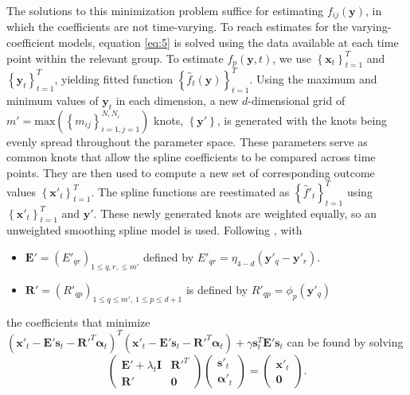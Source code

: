 \documentclass[11pt,reqno]{article}
\theoremstyle{definition}
\begin{document}
The solutions to this minimization problem suffice for estimating $f_{ij}(\mathbf{y})$, in which the coefficients are not time-varying. To reach estimates for the varying-coefficient models, equation \ref{eq:5} is solved using the data available at each time point within the relevant group. To estimate $f_p(\mathbf{y}, t)$, we use $\left\{\mathbf{x}_t\right\}_{t=1}^T$ and $\left\{\mathbf{y}_t\right\}_{t=1}^T$, yielding fitted function $\left\{\hat{f}_t(\mathbf{y})\right\}_{t=1}^T$. Using the maximum and minimum values of $\mathbf{y}_t$ in each dimension, a new $d$-dimensional grid of $m' = \text{max}\left(\left\{m_{ij}\right\}_{i=1, j = 1}^{N, N_i}\right)$ knots, $\left\{\mathbf{y}'\right\}$, is generated with the knots being evenly spread throughout the parameter space. These parameters serve as common knots that allow the spline coefficients to be compared across time points. They are then used to compute a new set of corresponding outcome values $\left\{\mathbf{x}'_t\right\}_{t=1}^{T}$. The spline functions are reestimated as $\left\{\hat{f}'_t\right\}_{t=1}^{T}$ using $\left\{\mathbf{x}'_t\right\}_{t=1}^{T}$ and $\mathbf{y}'$. These newly generated knots are weighted equally, so an unweighted smoothing spline model is used. Following \cite{greenSilverman1994}, with

\begin{itemize}
  \item $\mathbf{E}' = \left(E'_{qr}\right)_{1 \leq q, r, \leq m'}$ defined by $E'_{qr} = \eta_{4-d}\left(\mathbf{y}'_{q} - \mathbf{y}'_{r}\right)$.
  \item $\mathbf{R}' = \left(R'_{qp}\right)_{1 \leq q \leq m', \ 1 \leq p \leq d + 1}$ is defined by $R'_{qp} = \phi_p(\mathbf{y}'_{q})$
\end{itemize}
the coefficients that minimize $\left(\mathbf{x}'_t - \mathbf{E}'\mathbf{s}_t - \mathbf{R}'^{T}\mathbf{\alpha}_t\right)^{T}\left(\mathbf{x}'_t - \mathbf{E}'\mathbf{s}_t - \mathbf{R}'^{T}\mathbf{\alpha}_t\right) + \gamma\mathbf{s}_t^{T}\mathbf{E}'\mathbf{s}_t$ can be found by solving 
\begin{equation}
  \left(
  \begin{array}{cc}
    \mathbf{E}' + \lambda_{t}\mathbf{I} & \mathbf{R}'^{T} \\
    \mathbf{R}' & \mathbf{0}
  \end{array}
  \right)\left(
  \begin{array}{c}
    \mathbf{s}'_t \\
    \mathbf{\alpha}'_t
  \end{array}
  \right) = \left(
  \begin{array}{c}
    \mathbf{x}'_t \\
    \mathbf{0}
  \end{array}
  \right). \label{eq:7}
\end{equation}
\end{document}

